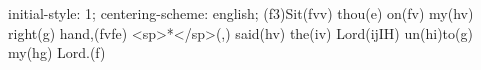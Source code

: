 initial-style: 1;
centering-scheme: english;
(f3)Sit(fvv) thou(e) on(fv) my(hv) right(g) hand,(fvfe) <sp>*</sp>(,) said(hv) the(iv) Lord(ijIH) un(hi)to(g) my(hg) Lord.(f)
